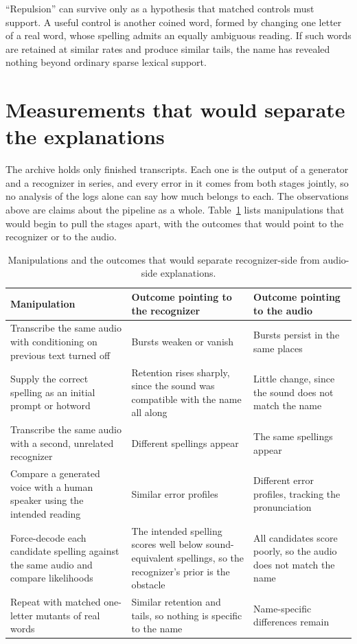 \documentclass[11pt]{article}
\begin{document}
``Repulsion'' can survive only as a hypothesis that matched controls must support. A useful control is another coined word, formed by changing one letter of a real word, whose spelling admits an equally ambiguous reading. If such words are retained at similar rates and produce similar tails, the name has revealed nothing beyond ordinary sparse lexical support.

\section{Measurements that would separate the explanations}
\label{sec:tests}

The archive holds only finished transcripts. Each one is the output of a generator and a recognizer in series, and every error in it comes from both stages jointly, so no analysis of the logs alone can say how much belongs to each. The observations above are claims about the pipeline as a whole. Table~\ref{tab:tests} lists manipulations that would begin to pull the stages apart, with the outcomes that would point to the recognizer or to the audio.

\begin{table}[!htbp]
\centering
\small
\begin{tabular}{p{}p{}p{}}
\toprule
Manipulation & Outcome pointing to the recognizer & Outcome pointing to the audio \\
\midrule
Transcribe the same audio with conditioning on previous text turned off & Bursts weaken or vanish & Bursts persist in the same places \\
Supply the correct spelling as an initial prompt or hotword & Retention rises sharply, since the sound was compatible with the name all along & Little change, since the sound does not match the name \\
Transcribe the same audio with a second, unrelated recognizer & Different spellings appear & The same spellings appear \\
Compare a generated voice with a human speaker using the intended reading & Similar error profiles & Different error profiles, tracking the pronunciation \\
Force-decode each candidate spelling against the same audio and compare likelihoods & The intended spelling scores well below sound-equivalent spellings, so the recognizer's prior is the obstacle & All candidates score poorly, so the audio does not match the name \\
Repeat with matched one-letter mutants of real words & Similar retention and tails, so nothing is specific to the name & Name-specific differences remain \\
\bottomrule
\end{tabular}
\caption{Manipulations and the outcomes that would separate recognizer-side from audio-side explanations.}
\label{tab:tests}
\end{table}
\end{document}
